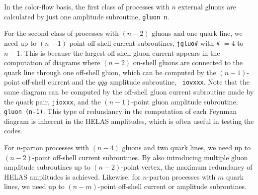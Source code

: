 In the color-flow basis,
  the first class of processes with $n$ external gluons are calculated
  by just one amplitude subroutine, {\tt gluon\,n}.

For the
  second class of processes with $(n-2)$ gluons and one quark line, we
  need up to $(n-1)$-point off-shell current subroutines, {\tt jgluo\#}
  with {\tt \#} $=4$ to $n-1$. This is because the largest off-shell
  gluon current appears in the computation of diagrams where $(n-2)$ on-shell gluons are connected to
  the quark line through one off-shell gluon, which can be computed by the $(n-1)$-point off-shell
  current and the $q\overline{q}g$ amplitude subroutine, {\tt
  iovxxx}. Note that the same diagram can be computed by the off-shell
  gluon current subroutine made by the quark pair, {\tt jioxxx}, and the
  $(n-1)$-point gluon amplitude subroutine, {\tt gluon\,(n-1)}. This
  type of redundancy in the computation of each Feynman diagram is
  inherent in the HELAS amplitudes, which is often useful in testing the
  codes.

 For $n$-parton processes with $(n-4)$ gluons and two quark lines, we need
up to $(n-2)$-point off-shell current subroutines. By also introducing
multiple gluon amplitude subroutines up to $(n-2)$-point vertex, the maximum
redundancy of HELAS amplitudes is achieved. Likewise, for $n$-parton
processes with $m$ quark lines, we need up to $(n-m)$-point off-shell
current or amplitude subroutines.
 
